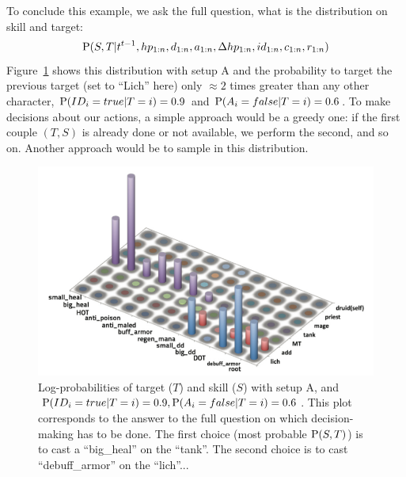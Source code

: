 To conclude this example, we ask the full question, what is the distribution on skill and target:
$$\mathrm{P}(S,T|t^{t-1},hp_{1:n},d_{1:n}, a_{1:n}, \Delta hp_{1:n}, id_{1:n}, c_{1:n}, r_{1:n})$$
Figure~\ref{fig:wow_target_skill} shows this distribution %
with setup A and the probability to target the previous target (set to ``Lich'' here) only $\approx 2$ times greater than any other character, %
$\mathrm{P}(ID_i=true|T=i)=0.9$ and $\mathrm{P}(A_i=false|T=i)=0.6$. To make decisions about our actions, a simple approach would be a greedy one: if the first couple $(T,S)$ is already done or not available, we perform the second, and so on. Another approach would be to sample in this distribution.

\begin{figure}[h!]
\begin{center}
\includegraphics[width=0.92\columnwidth]{images/wow_distrib_target_skill.png}
\caption{Log-probabilities of target ($T$) and skill ($S$) with setup A, and $\mathrm{P}(ID_i=true|T=i)=0.9, \mathrm{P}(A_i=false|T=i)=0.6$. This plot corresponds to the answer to the full question on which decision-making has to be done. The first choice (most probable $\mathrm{P}(S,T)$) is to cast a ``big\_heal'' on the ``tank''. The second choice is to cast ``debuff\_armor'' on the ``lich''...}
\label{fig:wow_target_skill}
\end{center}
\end{figure}

